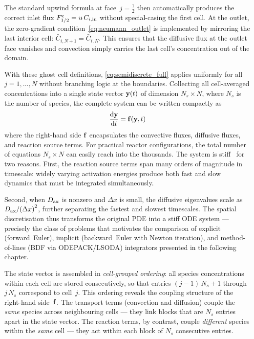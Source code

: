 The standard upwind formula at face~\(j = \tfrac{1}{2}\) then automatically produces the correct inlet flux \(F^{\mathrm{c}}_{1/2} = u\,C_{i,\mathrm{in}}\) without special-casing the first cell. At the outlet, the zero-gradient condition~\eqref{eq:neumann_outlet} is implemented by mirroring the last interior cell: \(\bar{C}_{i,N+1} = \bar{C}_{i,N}\). This ensures that the diffusive flux at the outlet face vanishes and convection simply carries the last cell's concentration out of the domain. 

With these ghost cell definitions, \cref{eq:semidiscrete_full} applies uniformly for all \(j = 1, \ldots, N\) without branching logic at the boundaries. Collecting all cell-averaged concentrations into a single state vector \(\mathbf{y}(t)\) of dimension \(N_s \times N\), where \(N_s\) is the number of species, the complete system can be written compactly as~\cite{HairerWanner1996}
%
\begin{equation}
  \frac{\mathrm{d}\mathbf{y}}{\mathrm{d}t} = \mathbf{f}(\mathbf{y}, t)
  \label{eq:ode_system}
\end{equation}
%
where the right-hand side \(\mathbf{f}\) encapsulates the convective fluxes, diffusive fluxes, and reaction source terms. For practical reactor configurations, the total number of equations \(N_s \times N\) can easily reach into the thousands. The system is stiff~\cite{HairerWanner1996} for two reasons. First, the reaction source terms span many orders of magnitude in timescale: widely varying activation energies produce both fast and slow dynamics that must be integrated simultaneously. 

Second, when \(D_{\mathrm{ax}}\) is nonzero and \(\Delta x\) is small, the diffusive eigenvalues scale as \(D_{\mathrm{ax}} / {(\Delta x)}^{2}\), further separating the fastest and slowest timescales. The spatial discretisation thus transforms the original PDE into a stiff ODE system --- precisely the class of problems that motivates the comparison of explicit (forward~Euler), implicit (backward~Euler with Newton iteration), and method-of-lines (BDF via ODEPACK/LSODA) integrators presented in the following chapter.

The state vector is assembled in \emph{cell-grouped ordering}: all species concentrations within each cell are stored consecutively, so that entries \((j-1)\,N_s + 1\) through \(j\,N_s\) correspond to cell~\(j\). This ordering reveals the coupling structure of the right-hand side~\(\mathbf{f}\). The transport terms (convection and diffusion) couple the \emph{same} species across neighbouring cells --- they link blocks that are \(N_s\) entries apart in the state vector. The reaction terms, by contrast, couple \emph{different} species within the \emph{same} cell --- they act within each block of \(N_s\) consecutive entries.

